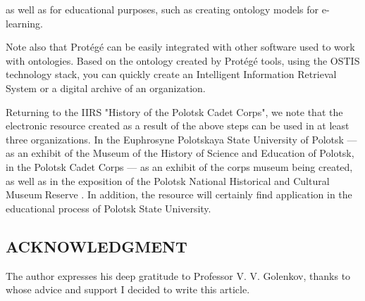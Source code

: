 \documentclass{article}
\begin{document}
\begin{multicols}{2}
as well as for educational purposes, such as creating
ontology models for e-learning.
\par Note also that Protégé can be easily integrated with
other software used to work with ontologies. Based on
the ontology created by Protégé tools, using the OSTIS
technology stack, you can quickly create an Intelligent
Information Retrieval System or a digital archive of an
organization.
\par Returning to the IIRS "History of the Polotsk Cadet
Corps", we note that the electronic resource created as
a result of the above steps can be used in at least
three organizations. In the Euphrosyne Polotskaya State
University of Polotsk — as an exhibit of the Museum
of the History of Science and Education of Polotsk, in
the Polotsk Cadet Corps — as an exhibit of the corps
museum being created, as well as in the exposition of
the Polotsk National Historical and Cultural MuseumReserve . In addition, the resource will certainly find
application in the educational process of Polotsk State
University.
\begin{center}
\chapter{ACKNOWLEDGMENT}
\end{center}
\par The author expresses his deep gratitude to Professor
V. V. Golenkov, thanks to whose advice and support I
decided to write this article.
\begin{center}

\end{center}
\end{multicols}
\end{document}
